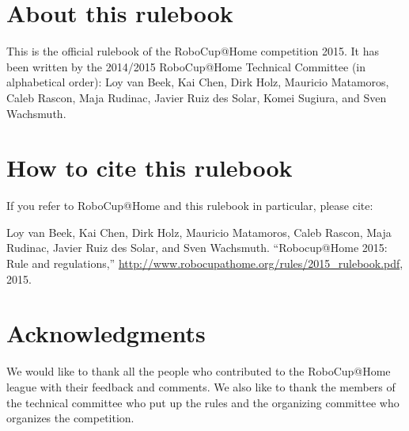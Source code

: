


\section*{About this rulebook}
This is the official rulebook of the RoboCup@Home competition 2015.
It has been written by the 2014/2015 RoboCup@Home Technical Committee (in alphabetical order): 
Loy van Beek, 
Kai Chen, 
Dirk Holz,  
Mauricio Matamoros, 
Caleb Rascon, 
Maja Rudinac, 
Javier Ruiz des Solar, 
Komei Sugiura, and 
Sven Wachsmuth.

\section*{How to cite this rulebook}
If you refer to RoboCup@Home and this rulebook in particular, please cite:

Loy van Beek, Kai Chen, Dirk Holz, Mauricio Matamoros, Caleb Rascon, Maja Rudinac, Javier Ruiz des Solar, and Sven Wachsmuth. 
``Robocup@Home 2015: Rule and regulations,'' 
\url{http://www.robocupathome.org/rules/2015_rulebook.pdf}, 2015.



\section*{Acknowledgments}
\label{sec:acknowledgments}


We would like to thank all the people who contributed to the RoboCup@Home league 
with their feedback and comments. 
We also like to thank the members of the technical committee who put up the rules
and the organizing committee who organizes the competition.  

